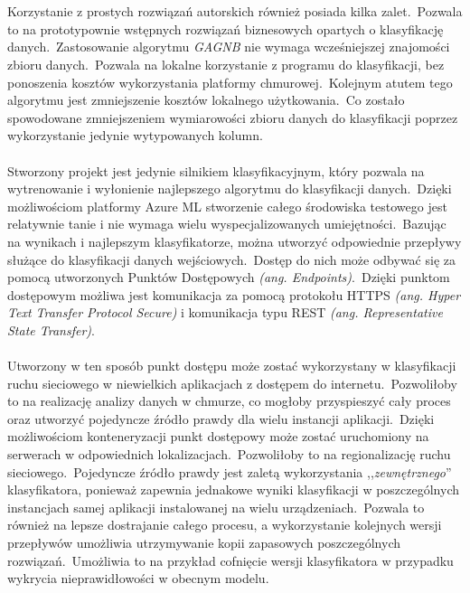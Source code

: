 \\ \\
Korzystanie z prostych rozwiązań autorskich również posiada kilka zalet.\ Pozwala to na prototypownie wstępnych rozwiązań biznesowych opartych o klasyfikację danych.\ Zastosowanie algorytmu \textit{GAGNB} nie wymaga wcześniejszej znajomości zbioru danych.\ Pozwala na lokalne korzystanie z programu do klasyfikacji, bez ponoszenia kosztów wykorzystania platformy chmurowej.\ Kolejnym atutem tego algorytmu jest zmniejszenie kosztów lokalnego użytkowania.\ Co zostało spowodowane zmniejszeniem wymiarowości zbioru danych do klasyfikacji poprzez wykorzystanie jedynie wytypowanych kolumn.
\\ \\
Stworzony projekt jest jedynie silnikiem klasyfikacyjnym, który pozwala na wytrenowanie i wyłonienie najlepszego algorytmu do klasyfikacji danych.\ Dzięki możliwościom platformy Azure ML stworzenie całego środowiska testowego jest relatywnie tanie i nie wymaga wielu wyspecjalizowanych umiejętności.\ Bazując na wynikach i najlepszym klasyfikatorze, można utworzyć odpowiednie przepływy służące do klasyfikacji danych wejściowych.\ Dostęp do nich może odbywać się za pomocą utworzonych Punktów Dostępowych \textit{(ang. Endpoints)}.\ Dzięki punktom dostępowym możliwa jest komunikacja za pomocą protokołu HTTPS \textit{(ang. Hyper Text Transfer Protocol Secure)} i komunikacja typu REST \textit{(ang. Representative State Transfer)}.
\\ \\
Utworzony w ten sposób punkt dostępu może zostać wykorzystany w klasyfikacji ruchu sieciowego w niewielkich aplikacjach z dostępem do internetu.\ Pozwoliłoby to na realizację analizy danych w chmurze, co mogłoby przyspieszyć cały proces oraz utworzyć pojedyncze źródło prawdy dla wielu instancji aplikacji.\ Dzięki możliwościom konteneryzacji punkt dostępowy może zostać uruchomiony na serwerach w odpowiednich lokalizacjach.\ Pozwoliłoby to na regionalizację ruchu sieciowego.\ Pojedyncze źródło prawdy jest zaletą wykorzystania ,,\textit{zewnętrznego}'' klasyfikatora, ponieważ zapewnia jednakowe wyniki klasyfikacji w poszczególnych instancjach samej aplikacji instalowanej na wielu urządzeniach.\ Pozwala to również na lepsze dostrajanie całego procesu, a wykorzystanie kolejnych wersji przepływów umożliwia utrzymywanie kopii zapasowych poszczególnych rozwiązań.\ Umożliwia to na przykład cofnięcie wersji klasyfikatora w przypadku wykrycia nieprawidłowości w obecnym modelu.
